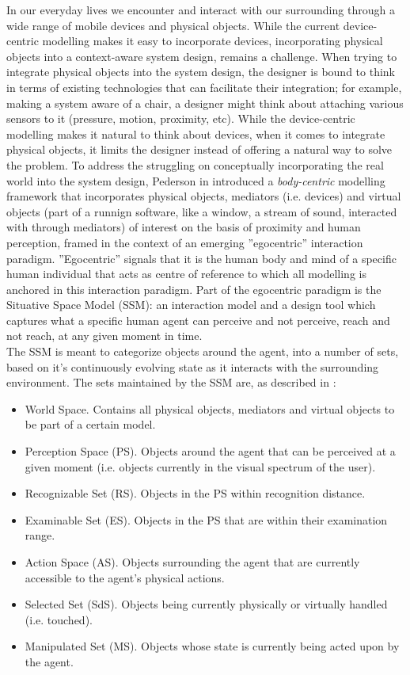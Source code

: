 In our everyday lives we encounter and interact with our surrounding through a wide range of mobile devices and physical objects. While the current device-centric modelling makes it easy to incorporate devices, incorporating physical objects into a context-aware system design, remains a challenge. When trying to integrate physical objects into the system design, the designer is bound to think in terms of existing technologies that can facilitate their integration; for example, making a system aware of a chair, a designer might think about attaching various sensors to it (pressure, motion, proximity, etc). While the device-centric modelling makes it natural to think about devices, when it comes to integrate physical objects, it limits the designer instead of offering a natural way to solve the problem. To address the struggling on conceptually incorporating the real world into the system design, Pederson in \cite{pederson2010towards} introduced a \emph{body-centric} modelling framework that incorporates physical objects, mediators (i.e. devices) and virtual objects (part of a runnign software, like a window, a stream of sound, interacted with through mediators) of interest on the basis of proximity and human perception, framed in the context of an emerging ''egocentric'' interaction paradigm. ''Egocentric'' signals that it is the human body and mind of a specific human individual that acts as centre of reference to which all modelling is anchored in this interaction paradigm. Part of the egocentric paradigm is the Situative Space Model (SSM): an interaction model and a design tool which captures what a specific human agent can perceive and not perceive, reach and not reach, at any given moment in time.\\

The SSM is meant to categorize objects around the agent, into a number of sets, based on it's continuously evolving state as it interacts with the surrounding environment. The sets maintained by the SSM are, as described in \cite{pederson2010towards}:
\begin{itemize}
	\item World Space. Contains all physical objects, mediators and virtual objects to be part of a certain model.
	\item Perception Space (PS). Objects around the agent that can be perceived at a given moment (i.e. objects currently in the visual spectrum of the user).
	\item Recognizable Set (RS). Objects in the PS within recognition distance.
	\item Examinable Set (ES). Objects in the PS that are within their examination range.
	\item Action Space (AS). Objects surrounding the agent that are currently accessible to the agent's physical actions.
	\item Selected Set (SdS). Objects being currently physically or virtually handled (i.e. touched).
	\item Manipulated Set (MS). Objects whose state is currently being acted upon by the agent.
\end{itemize}

